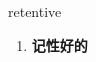 
\begin{frame}
{\huge retentive}
\begin{center}
\begin{enumerate}\Large
  \item \textbf{记性好的}
\end{enumerate}
\end{center}
\end{frame}
